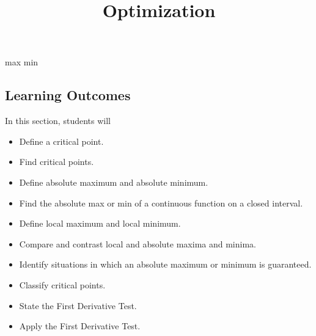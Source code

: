 \documentclass{ximera}
\title{Optimization}
\begin{document}
\begin{abstract}
\end{abstract}
\maketitle


max min







\subsection{Learning Outcomes}


\begin{sectionOutcomes}
In this section, students will 

\begin{itemize}
\item Define a critical point.
\item Find critical points.
\item Define absolute maximum and absolute minimum.
\item Find the absolute max or min of a continuous function on a closed interval.
\item Define local maximum and local minimum.
\item Compare and contrast local and absolute maxima and minima.
\item Identify situations in which an absolute maximum or minimum is guaranteed.
\item Classify critical points.
\item State the First Derivative Test.
\item Apply the First Derivative Test.
\end{itemize}
\end{sectionOutcomes}
\end{document}
